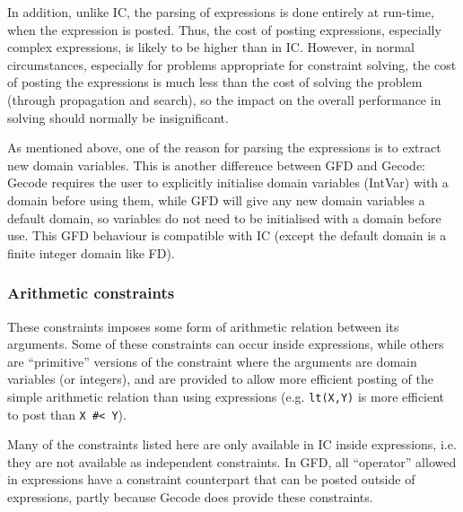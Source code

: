 In addition,
unlike IC, the parsing of expressions is done entirely at run-time, when the
expression is posted. Thus, the cost of posting expressions, especially 
complex expressions, is likely to be higher than in IC. However, in normal
circumstances, especially for problems appropriate for constraint solving,  
the cost of posting the expressions is much less than the 
cost of solving the problem (through propagation and search), so the impact
on the overall performance in solving should normally be insignificant.

As mentioned above, one of the reason for parsing the expressions is to
extract new domain variables. This is another difference between GFD and
Gecode: Gecode requires the user to explicitly initialise domain variables 
(IntVar) with a domain before using them, while GFD will give any new 
domain variables a default domain, so variables do not need to be 
initialised  with a domain before use. This GFD behaviour is compatible with
IC (except the default domain is a finite integer domain like FD).



\subsubsection{Arithmetic constraints}

These constraints imposes some form of arithmetic relation between its
arguments. Some of these constraints can occur inside expressions, while
others are ``primitive'' versions of the constraint where the arguments
are domain variables (or integers), and are provided to  allow more efficient
posting of the simple arithmetic relation than using expressions (e.g.
{\tt lt(X,Y)} is more efficient to post than {\tt X \#< Y}).

Many of the constraints listed here are only available in IC inside
expressions, i.e. they are not available as independent constraints.
In GFD, all ``operator'' allowed in expressions have a constraint
counterpart that can be posted outside of expressions, partly because
Gecode does provide these constraints.


